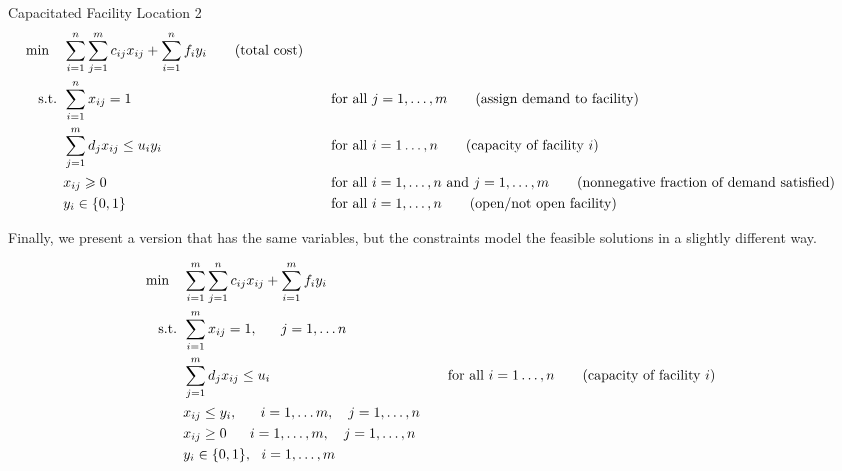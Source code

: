 \begin{general}{Capacitated Facility Location 2}{\npcomplete}
\begin{align}
\min \quad & \displaystyle\sum_{i=1}^n\sum_{j=1}^mc_{ij}x_{ij}+\sum_{i=1}^nf_iy_i   \tag{total cost} \\
\text{ s.t. }        & \displaystyle\sum_{i=1}^nx_{ij}=1 &&\quad \text{for all } j=1,\dots,m   \tag{assign demand to facility} \\
& \displaystyle \sum_{j=1}^md_jx_{ij}\leq u_iy_i &&\quad \text{for all } i=1\dots,n   \tag{capacity of facility $i$} \\
& x_{ij}\geqslant0 &&\quad \text{for all } i=1,\dots,n \text{ and }j=1,\dots,m   \tag{nonnegative fraction of demand satisfied} \\
& y_i\in\{0,1\} &&\quad \text{for all } i=1,\dots,n   \tag{open/not open facility}
\end{align}

\end{general}

Finally, we present a version that has the same variables, but the constraints model the feasible solutions in a slightly different way.

\begin{align*}
\min \quad & \sum_{i = 1}^m\sum_{j=1}^n c_{ij}x_{ij}+\sum_{i = 1}^mf_iy_i \\
\text{ s.t. }        & \sum_{i = 1}^mx_{ij} = 1,~~~~~j =1,\ldots n \\
& \displaystyle \sum_{j=1}^md_jx_{ij}\leq u_i &&\quad \text{for all } i=1\dots,n   \tag{capacity of facility $i$} \\
& x_{ij}\leq y_i,~~~~~ i = 1,\ldots m,~~~ j = 1,\ldots,n \\
& x_{ij} \geq 0~~~~~ i = 1,\ldots,m, ~~~j = 1,\ldots,n \\
& y_i\in \{0,1\}, \  \  i = 1,\ldots,m
\end{align*}
\fi  %


